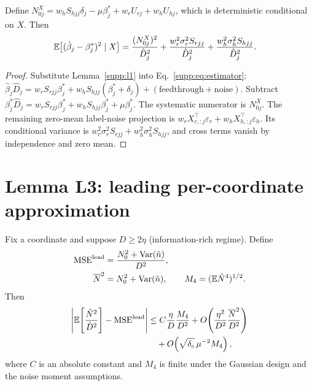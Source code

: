 \begin{lemma}\label{supp:l2}
Define $N_{0j}^{X}=w_hS_{hjj}\delta_j-\mu\beta^*_j+w_rU_{rj}+w_hU_{hj}$, which is deterministic conditional on $X$. Then
\begin{align}
  \mathbb{E}\big[(\hat\beta_j-\beta^*_j)^2\mid X\big]
  &=\frac{(N_{0j}^{X})^2}{\hat D_j^2}
  +\frac{w_r^2\sigma_r^2S_{rjj}}{\hat D_j^2}
  +\frac{w_h^2\sigma_h^2S_{hjj}}{\hat D_j^2}.
  \label{supp:eq:l2}
\end{align}
\end{lemma}

\begin{proof}
Substitute Lemma~\ref{supp:l1} into Eq.~\eqref{supp:eq:estimator}:
$\hat\beta_j \hat D_j = w_r S_{rjj}\beta^*_j + w_h S_{hjj}(\beta^*_j + \delta_j) + (\text{feedthrough} + \text{noise})$.
Subtract $\beta^*_j \hat D_j = w_r S_{rjj}\beta^*_j + w_h S_{hjj}\beta^*_j + \mu\beta^*_j$. The systematic numerator is $N_{0j}^{X}$. The remaining zero-mean label-noise projection is $w_rX_{r,:j}^\top\varepsilon_r+w_hX_{h,:j}^\top\varepsilon_h$. Its conditional variance is $w_r^2\sigma_r^2S_{rjj}+w_h^2\sigma_h^2S_{hjj}$, and cross terms vanish by independence and zero mean.
\end{proof}

\section{Lemma L3: leading per-coordinate approximation}
\label{supp:l3}

\begin{lemma}\label{supp:l3lem}
Fix a coordinate and suppose $D \ge 2\eta$ (information-rich regime).
Define
\begin{align}
  \mathrm{MSE}^{\mathrm{lead}} &= \frac{N_0^2 + \mathrm{Var}(\tilde n)}{D^2}, \notag\\
  \overline N^2 &= N_0^2 + \mathrm{Var}(\tilde n),
  \qquad M_4=(\mathbb{E}\hat N^4)^{1/2}.
  \label{supp:eq:mselead}
\end{align}
Then
\begin{align}
  \left|\mathbb{E}\!\left[\frac{\hat N^2}{\hat D^2}\right]-\mathrm{MSE}^{\mathrm{lead}}\right|
  &\le C\frac{\eta}{D}\frac{M_4}{D^2}
  +O\!\left(\frac{\eta^2}{D^2}\frac{\overline N^2}{D^2}\right) \notag\\
  &\quad+O\!\left(\sqrt{\delta_c}\,\mu^{-2}M_4\right),
  \label{supp:eq:l3bound}
\end{align}
where $C$ is an absolute constant and $M_4$ is finite under the Gaussian design and the noise moment assumptions.
\end{lemma}

